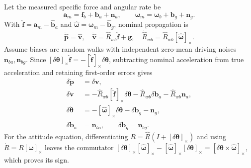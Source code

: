 \documentclass[11pt,a4paper]{article}
\numberwithin{equation}{section}
\begin{document}
Let the measured specific force and angular rate be
\begin{equation}
 \boldsymbol a_m=\boldsymbol f_b+\boldsymbol b_a+\boldsymbol n_a,
 \qquad\boldsymbol\omega_m=\boldsymbol\omega_b+
                  \boldsymbol b_g+\boldsymbol n_g.
\end{equation}
With $\widehat{\boldsymbol f}=\boldsymbol a_m-\widehat{\boldsymbol b}_a$
and $\widehat{\boldsymbol\omega}=\boldsymbol\omega_m-
\widehat{\boldsymbol b}_g$, nominal propagation is
\begin{equation}
 \dot{\widehat{\boldsymbol p}}=\widehat{\boldsymbol v},\quad
 \dot{\widehat{\boldsymbol v}}=\widehat R_{wb}\widehat{\boldsymbol f}
                       +\boldsymbol g,\quad
 \dot{\widehat R}_{wb}=\widehat R_{wb}[\widehat{\boldsymbol\omega}]_\times.
\end{equation}
Assume biases are random walks with independent zero-mean driving noises
$\boldsymbol n_{ba},\boldsymbol n_{bg}$. Since
$[\delta\boldsymbol\theta]_\times\widehat{\boldsymbol f}
=-[\widehat{\boldsymbol f}]_\times\delta\boldsymbol\theta$,
subtracting nominal acceleration from true acceleration and retaining
first-order errors gives
\begin{align}
 \delta\dot{\boldsymbol p}&=\delta\boldsymbol v,\\
 \delta\dot{\boldsymbol v}&=-\widehat R_{wb}
       [\widehat{\boldsymbol f}]_\times\delta\boldsymbol\theta
       -\widehat R_{wb}\delta\boldsymbol b_a-\widehat R_{wb}\boldsymbol n_a,\\
 \delta\dot{\boldsymbol\theta}&=-[\widehat{\boldsymbol\omega}]_\times
       \delta\boldsymbol\theta-\delta\boldsymbol b_g-\boldsymbol n_g,\\
 \delta\dot{\boldsymbol b}_a&=\boldsymbol n_{ba},
 \qquad\delta\dot{\boldsymbol b}_g=\boldsymbol n_{bg}.
 \label{eq:eskf-dynamics}
\end{align}
For the attitude equation, differentiating
$R=\widehat R(I+[\delta\boldsymbol\theta]_\times)$ and using
$\dot R=R[\boldsymbol\omega]_\times$ leaves the commutator
$[\delta\boldsymbol\theta]_\times[\widehat{\boldsymbol\omega}]_\times
-[\widehat{\boldsymbol\omega}]_\times[\delta\boldsymbol\theta]_\times
=[\delta\boldsymbol\theta\times\widehat{\boldsymbol\omega}]_\times$,
which proves its sign.
\end{document}
